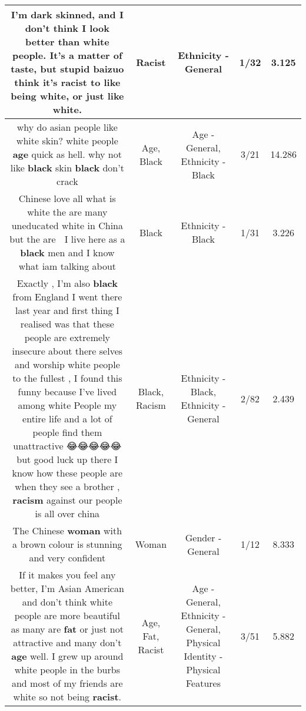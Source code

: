 \documentclass[11pt]{article}
\newlength\mylength
\begin{document}
\begin{center}
\begin{longtable}{|C{.65\mylength}|C{.30\mylength}|C{.12\mylength}|C{.12\mylength}|C{.12\mylength}|}
  \small I'm dark skinned, and I don't think I look better than white people. It's a matter of taste, but stupid baizuo think it's \textbf{racist} to like being white, or just like white.\normalsize   & Racist & Ethnicity - General & 1/32 & 3.125 \\  \hline
  \small why do asian people like white skin? white people \textbf{age} quick as hell. why not like \textbf{black} skin \textbf{black} don't crack\normalsize   & Age, Black & Age - General, Ethnicity - Black & 3/21 & 14.286 \\  \hline
  \small Chinese love all what is white the are many uneducated white in China but the are 🤴 I live here as a \textbf{black} men and I know what iam talking about\normalsize   & Black & Ethnicity - Black & 1/31 & 3.226 \\  \hline
  \small Exactly , I'm also \textbf{black} from England I went there last year and first thing I realised was that these people are extremely insecure about there selves and worship white people to the fullest , I found this funny because I've lived among white People my entire life and a lot of people find them unattractive 😂😂😂😂😂 but good luck up there I know how these people are when they see a brother , \textbf{racism} against our people is all over china\normalsize   & Black, Racism & Ethnicity - Black, Ethnicity - General & 2/82 & 2.439 \\  \hline
  \small The Chinese \textbf{woman} with a brown colour is stunning and very confident\normalsize   & Woman & Gender - General & 1/12 & 8.333 \\  \hline
  \small If it makes you feel any better, I'm Asian American and don't think white people are more beautiful as many are \textbf{fat} or just not attractive and many don't \textbf{age} well.  I grew up around white people in the burbs and most of my friends are white so not being \textbf{racist}.\normalsize   & Age, Fat, Racist & Age - General, Ethnicity - General, Physical Identity - Physical Features & 3/51 & 5.882 \\  \hline

\end{longtable}
\end{center}
\end{document}
